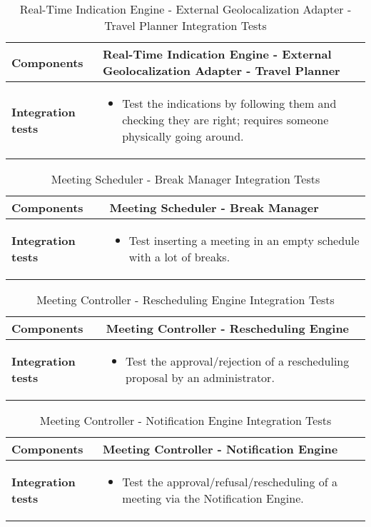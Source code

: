 \begin{table}[H]	
	\centering
	\def\arraystretch{1.5}
	\begin{tabular}{|m{4cm}|m{12cm}|}
		\hline
		\textbf{Components} & Real-Time Indication Engine - External Geolocalization Adapter - Travel Planner \\ \hline
		\textbf{Integration tests} & 
			\begin{itemize}
			\item Test the indications by following them and checking they are right; requires someone physically going around.
			\end{itemize}   \\ \hline
	\end{tabular}
	\caption{Real-Time Indication Engine - External Geolocalization Adapter - Travel Planner Integration Tests}
\end{table}

\begin{table}[H]	
	\centering
	\def\arraystretch{1.5}
	\begin{tabular}{|m{4cm}|m{12cm}|}
		\hline
		\textbf{Components} & Meeting Scheduler - Break Manager \\ \hline
		\textbf{Integration tests} & 
			\begin{itemize}
			\item Test inserting a meeting in an empty schedule with a lot of breaks.
			\end{itemize} \\ \hline
	\end{tabular}
	\caption{Meeting Scheduler - Break Manager Integration Tests}
\end{table}

\begin{table}[H]	
	\centering
	\def\arraystretch{1.5}
	\begin{tabular}{|m{4cm}|m{12cm}|}
		\hline
		\textbf{Components} & Meeting Controller - Rescheduling Engine \\ \hline
		\textbf{Integration tests} & 
			\begin{itemize}
			\item Test the approval/rejection of a rescheduling proposal by an administrator.
			\end{itemize} \\ \hline
	\end{tabular}
	\caption{Meeting Controller - Rescheduling Engine Integration Tests}
\end{table}

\begin{table}[H]	
	\centering
	\def\arraystretch{1.5}
	\begin{tabular}{|m{4cm}|m{12cm}|}
		\hline
		\textbf{Components} & Meeting Controller - Notification Engine \\ \hline
		\textbf{Integration tests} & 
			\begin{itemize}
			\item Test the approval/refusal/rescheduling of a meeting via the Notification Engine.
			\end{itemize} \\ \hline
	\end{tabular}
	\caption{Meeting Controller - Notification Engine Integration Tests}
\end{table}